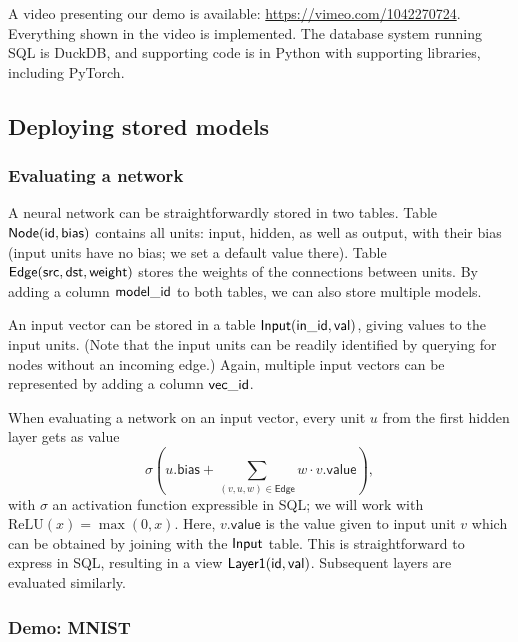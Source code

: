 \documentclass{article}
\newcommand{\ReLU}{\mathrm{ReLU}}
\begin{document}
\begin{tcolorbox}
  A video presenting our demo is available:
  \url{https://vimeo.com/1042270724}.  Everything shown in the
  video is implemented.  The database system running SQL is DuckDB, and
  supporting code is in Python with supporting libraries,
  including PyTorch.
\end{tcolorbox}

\subsection{Deploying stored models} \label{secdeploy}

\subsubsection*{Evaluating a network}

A neural network can be
straightforwardly stored in two tables. Table $\sf Node(id,bias)$
contains all units: input, hidden, as well as output, with
their bias (input units have no bias; we set a default value
there).  Table $\sf Edge(src,dst,weight)$ stores the
weights of the connections between units.  By adding a column
$\sf model\_id$ to both tables, we can also store multiple models.

An input vector can be stored in a table $\sf
Input(in\_id,val)$, giving values to the input units.  (Note that the
input units can be readily identified 
by querying for nodes without an incoming edge.)  Again, multiple
input vectors can be represented by adding a column $\sf vec\_id$.

When evaluating a network on an input vector, every unit $u$ from the
first hidden layer gets as value
\begin{equation}
  \label{evalunit}
  \sigma
(u.\mathsf{bias} + \sum_{(v,u,w) \in
  \mathsf{Edge}} w \cdot v.\mathsf{value}),
\end{equation}
with $\sigma$ an activation function expressible in SQL; we will
work with
$\ReLU(x)=\max(0,x)$.  Here, $v.\mathsf{value}$ is the value
given to input unit $v$ which can be obtained by joining with
the $\sf Input$ table.  This is straightforward to express in
SQL, resulting in a view $\sf Layer1(id,val)$.
Subsequent layers are evaluated similarly.

\subsubsection*{Demo: MNIST}
\end{document}
